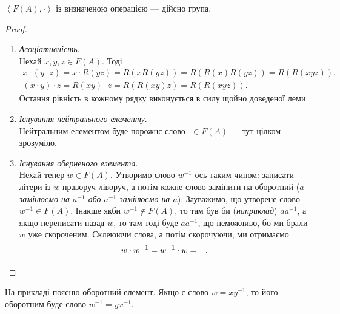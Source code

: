 \documentclass{math_library}
\begin{document}
\begin{proposition}
$\left< F(A), \cdot \right>$ із визначеною операцією --- дійсно група.
\end{proposition}

\begin{proof}
\begin{enumerate}[topsep=0pt, label={\Roman*.}, wide=0pt]
\item \textit{Асоціативність}.\\
Нехай $x,y,z \in F(A)$. Тоді
\begin{align*}
x \cdot (y \cdot z) = x \cdot R(yz) = R(x R(yz)) = R(R(x) R(yz)) = R(R(xyz)).\\
(x \cdot y) \cdot z = R(xy) \cdot z = R(R(xy)z) = R(R(xyz)).
\end{align*}
Остання рівність в кожному рядку виконується в силу щойно доведеної леми.

\item \textit{Існування нейтрального елементу}.\\
Нейтральним елементом буде порожнє слово $\_ \in F(A)$ --- тут цілком зрозуміло.

\item \textit{Існування оберненого елемента}.\\
Нехай тепер $w \in F(A)$. Утворимо слово $w^{-1}$ ось таким чином: записати літери із $w$ праворуч-ліворуч, а потім кожне слово замінити на оборотний (\textit{$a$ замінюємо на $a^{-1}$ або $a^{-1}$ замінюємо на $a$}). Зауважимо, що утворене слово $w^{-1} \in F(A)$. Інакше якби $w^{-1} \notin F(A)$, то там був би (\textit{наприклад}) $aa^{-1}$, а якщо переписати назад $w$, то там тоді буде $aa^{-1}$, що неможливо, бо ми брали $w$ уже скороченим. Склеюючи слова, а потім скорочуючи, ми отримаємо
\[ 
w \cdot w^{-1} = w^{-1} \cdot w = \_. \qedhere
\]
\end{enumerate}
\end{proof}

\begin{example}
На прикладі поясню оборотний елемент. Якщо є слово $w = xy^{-1}$, то його оборотним буде слово $w^{-1} = yx^{-1}$.
\end{example}
\end{document}
